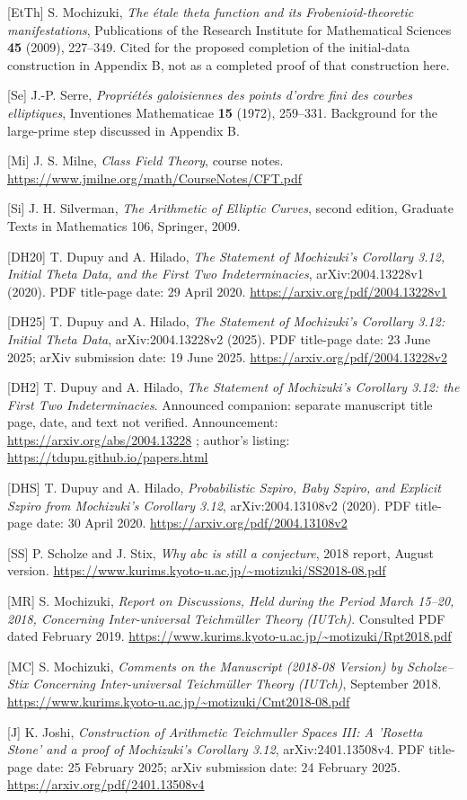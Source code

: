 \documentclass[11pt,a4paper]{amsart}
\begin{document}
[EtTh] S. Mochizuki, \emph{The étale theta function and its Frobenioid-theoretic manifestations}, Publications of the Research Institute for Mathematical Sciences \textbf{45} (2009), 227--349. Cited for the proposed completion of the initial-data construction in Appendix B, not as a completed proof of that construction here.


[Se] J.-P. Serre, \emph{Propriétés galoisiennes des points d'ordre fini des courbes elliptiques}, Inventiones Mathematicae \textbf{15} (1972), 259--331. Background for the large-prime step discussed in Appendix B.


[Mi] J. S. Milne, \emph{Class Field Theory}, course notes. \url{https://www.jmilne.org/math/CourseNotes/CFT.pdf}

[Si] J. H. Silverman, \emph{The Arithmetic of Elliptic Curves}, second edition, Graduate Texts in Mathematics 106, Springer, 2009.


[DH20] T. Dupuy and A. Hilado, \emph{The Statement of Mochizuki's Corollary 3.12, Initial Theta Data, and the First Two Indeterminacies}, arXiv:2004.13228v1 (2020). PDF title-page date: 29 April 2020. \url{https://arxiv.org/pdf/2004.13228v1}


[DH25] T. Dupuy and A. Hilado, \emph{The Statement of Mochizuki's Corollary 3.12: Initial Theta Data}, arXiv:2004.13228v2 (2025). PDF title-page date: 23 June 2025; arXiv submission date: 19 June 2025. \url{https://arxiv.org/pdf/2004.13228v2}


[DH2] T. Dupuy and A. Hilado, \emph{The Statement of Mochizuki's Corollary 3.12: the First Two Indeterminacies}. Announced companion: separate manuscript title page, date, and text not verified. Announcement: \url{https://arxiv.org/abs/2004.13228} ; author's listing: \url{https://tdupu.github.io/papers.html}


[DHS] T. Dupuy and A. Hilado, \emph{Probabilistic Szpiro, Baby Szpiro, and Explicit Szpiro from Mochizuki's Corollary 3.12}, arXiv:2004.13108v2 (2020). PDF title-page date: 30 April 2020. \url{https://arxiv.org/pdf/2004.13108v2}


[SS] P. Scholze and J. Stix, \emph{Why abc is still a conjecture}, 2018 report, August version. \url{https://www.kurims.kyoto-u.ac.jp/~motizuki/SS2018-08.pdf}


[MR] S. Mochizuki, \emph{Report on Discussions, Held during the Period March 15--20, 2018, Concerning Inter-universal Teichmüller Theory (IUTch)}. Consulted PDF dated February 2019. \url{https://www.kurims.kyoto-u.ac.jp/~motizuki/Rpt2018.pdf}


[MC] S. Mochizuki, \emph{Comments on the Manuscript (2018-08 Version) by Scholze--Stix Concerning Inter-universal Teichmüller Theory (IUTch)}, September 2018. \url{https://www.kurims.kyoto-u.ac.jp/~motizuki/Cmt2018-08.pdf}


[J] K. Joshi, \emph{Construction of Arithmetic Teichmuller Spaces III: A 'Rosetta Stone' and a proof of Mochizuki's Corollary 3.12}, arXiv:2401.13508v4. PDF title-page date: 25 February 2025; arXiv submission date: 24 February 2025. \url{https://arxiv.org/pdf/2401.13508v4}
\end{document}
